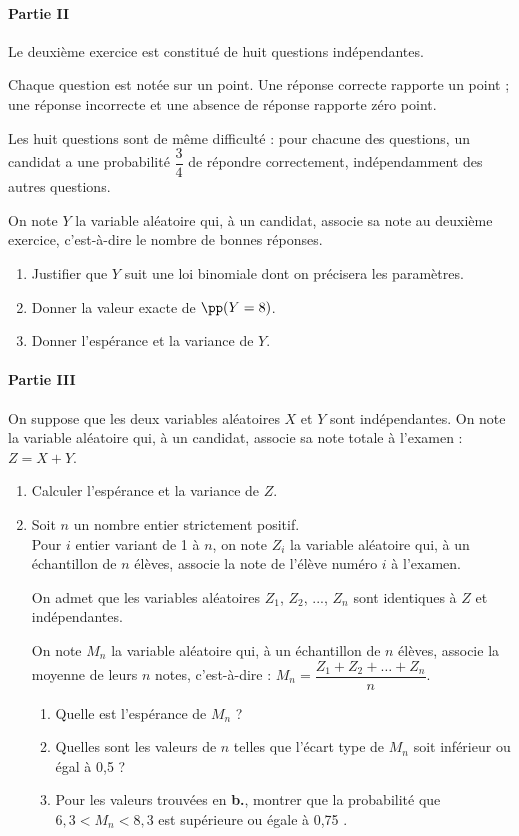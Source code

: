 \documentclass[11pt,fleqn, openany]{book} %
\begin{document}
\begin{exercise}[topic=lgn04, subtitle={(Sujet zéro 2024)}]
 \paragraph{Partie II}
 
Le deuxième exercice est constitué de huit questions indépendantes.

Chaque question est notée sur un point. Une réponse correcte rapporte un point ; une réponse incorrecte et une absence de réponse rapporte zéro point.

Les huit questions sont de même difficulté : pour chacune des questions, un candidat a une probabilité $\dfrac{3}{4}$ de répondre correctement, indépendamment des autres questions.

On note $Y$ la variable aléatoire qui, à un candidat, associe sa note au deuxième exercice, c'est-à-dire le nombre de bonnes réponses.

\begin{enumerate}
\item Justifier que $Y$ suit une loi binomiale dont on précisera les paramètres.
\item Donner la valeur exacte de $\pp(Y = 8)$.
\item Donner l'espérance et la variance de $Y$.
\end{enumerate}

\paragraph{Partie III}

On suppose que les deux variables aléatoires $X$ et $Y$ sont indépendantes. On note la variable aléatoire qui, à un candidat, associe sa note totale à l'examen : $Z = X +Y$.

\begin{enumerate}
\item Calculer l'espérance et la variance de $Z$.
\item Soit $n$ un nombre entier strictement positif.\\
Pour $i$ entier variant de 1 à $n$, on note $Z_i$ la variable aléatoire qui, à un échantillon de $n$ élèves, associe la note de l'élève numéro $i$ à l'examen.

On admet que les variables aléatoires $Z_1$, $Z_2$, ..., $Z_n$ sont identiques à $Z$ et indépendantes.

On note $M_n$  la variable aléatoire qui, à un échantillon de $n$ élèves, associe la moyenne de leurs $n$ notes, c'est-à-dire : $M_n=\dfrac{Z_1+Z_2+\ldots+Z_n}{n}$.
\vskip5pt
\begin{enumerate}
\item Quelle est l'espérance de $M_n$ ?
\item Quelles sont les valeurs de $n$ telles que l'écart type de $M_n$ soit inférieur ou égal à 0,5 ?
\item Pour les valeurs trouvées en \textbf{b.}, montrer que la probabilité que $6,3 < M_n < 8,3$ est supérieure ou égale à 0,75 .
\end{enumerate}
\end{enumerate}

\end{exercise}
\end{document}

